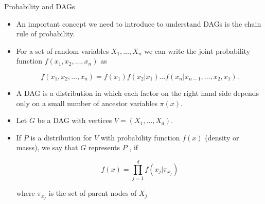 \documentclass[handout]{beamer}
\begin{document}
\begin{frame}{Probability and DAGs}
\scriptsize{
\begin{itemize}

\item An important concept we need to introduce to understand DAGs is the chain rule of probability.

\item For a set of random variables $X_1,\dots, X_n$ we can write the joint probability function $f(x_1,x_2,\dots, x_n)$ as 

\begin{displaymath}
f(x_1,x_2,\dots,x_n)=f(x_1)f(x_2|x_1)\dots f(x_n|x_{n-1},\dots,x_2,x_1).
 \end{displaymath}



\item A DAG is a distribution in which each factor on the right hand side depends only on a small number of ancestor variables $\pi(x)$. \cite{ermon_kuleshov}



\item Let $G$ be a DAG with vertices $V = (X_1 , \dots , X_d )$. 

\item If $P$ is a distribution for $V$ with probability function $f(x)$ (density or masss), we say that $G$ represents $P$ , if

\begin{displaymath}
 f(x) = \prod_{j=1}^d f(x_j| \pi_{x_j})
\end{displaymath}

where $\pi_{x_j}$ is the set of parent nodes of $X_j$



\end{itemize}



} 

\end{frame}
\end{document}
